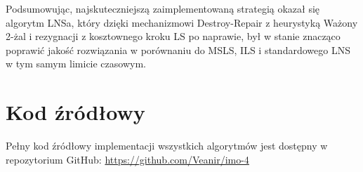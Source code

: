 \documentclass[12pt,a4paper]{article}
\begin{document}
Podsumowując, najskuteczniejszą zaimplementowaną strategią okazał się algorytm LNSa, który dzięki mechanizmowi Destroy-Repair z heurystyką Ważony 2-żal i rezygnacji z kosztownego kroku LS po naprawie, był w stanie znacząco poprawić jakość rozwiązania w porównaniu do MSLS, ILS i standardowego LNS w tym samym limicie czasowym.

\section{Kod źródłowy}
Pełny kod źródłowy implementacji wszystkich algorytmów jest dostępny w repozytorium GitHub:
\url{https://github.com/Veanir/imo-4}
\end{document}
